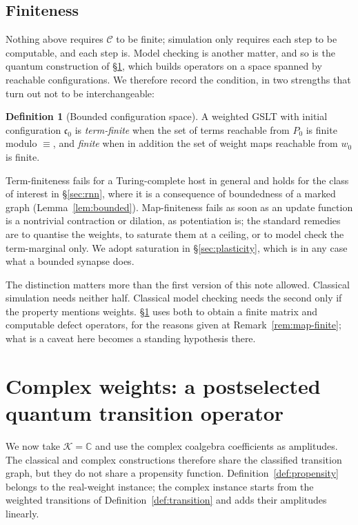 \documentclass[11pt,a4paper]{article}
\theoremstyle{plain}
\theoremstyle{definition}
\newtheorem{definition}[theorem]{Definition}
\theoremstyle{remark}
\newcommand{\Cx}{\mathbb{C}}
\newcommand{\Cfg}{\mathcal{C}}
\newcommand{\wmap}{w}
\begin{document}
\subsection{Finiteness}
\label{sec:finiteness}

Nothing above requires $\Cfg$ to be finite; simulation only requires each step to be computable, and
each step is. Model checking is another matter, and so is the quantum construction of
\S\ref{sec:quantum}, which builds operators on a space spanned by reachable configurations. We
therefore record the condition, in two strengths that turn out not to be interchangeable:

\begin{definition}[Bounded configuration space]
\label{def:bounded}
A weighted GSLT with initial configuration $\mathfrak{c}_0$ is \emph{term-finite} when the set of
terms reachable from $P_0$ is finite modulo $\equiv$, and \emph{finite} when in addition the set of
weight maps reachable from $\wmap_0$ is finite.
\end{definition}

Term-finiteness fails for a Turing-complete host in general and holds for the class of interest in
\S\ref{sec:rnn}, where it is a consequence of boundedness of a marked graph
(Lemma~\ref{lem:bounded}). Map-finiteness fails as soon as an update function is a nontrivial
contraction or dilation, as potentiation is; the standard remedies are to quantise the weights, to
saturate them at a ceiling, or to model check the term-marginal only. We adopt saturation in
\S\ref{sec:plasticity}, which is in any case what a bounded synapse does.

The distinction matters more than the first version of this note allowed. Classical simulation needs
neither half. Classical model checking needs the second only if the property mentions weights.
\S\ref{sec:quantum} uses both to obtain a finite matrix and computable defect operators, for the
reasons given at Remark~\ref{rem:map-finite}; what is a caveat here becomes a standing hypothesis
there.

\section{Complex weights: a postselected quantum transition operator}
\label{sec:quantum}

We now take $\mathcal{K}=\Cx$ and use the complex coalgebra coefficients as amplitudes.
The classical and complex constructions therefore share the classified transition graph, but they do
not share a propensity function. Definition~\ref{def:propensity} belongs to the real-weight instance;
the complex instance starts from the weighted transitions of Definition~\ref{def:transition} and adds
their amplitudes linearly.
\end{document}
